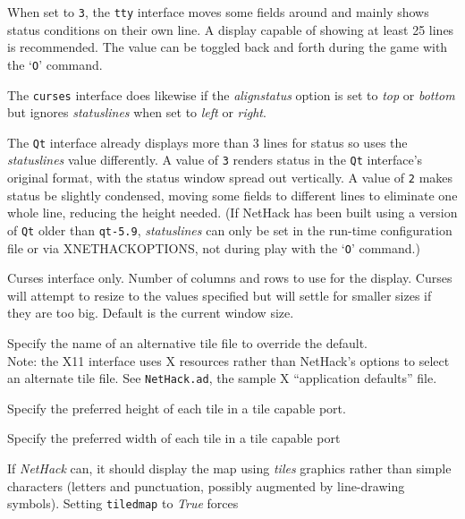 \documentclass[titlepage]{article}
\begin{document}
\begin{description}[font=\mdseries\itshape]
When set to \texttt{3}, the \texttt{tty} interface moves some fields around and
mainly shows status conditions on their own line.
A display capable of showing at least 25 lines is recommended.
The value can be toggled back and forth during the game with the `\texttt{O}'
command.

The \texttt{curses} interface does likewise if the
\textit{align\textunderscore status}
option is set to \textit{top} or \textit{bottom} but ignores
\textit{statuslines}
when set to \textit{left} or \textit{right}.

The \texttt{Qt} interface already displays more than 3 lines for status
so uses the
\textit{statuslines}
value differently.
A value of \texttt{3} renders status in the \texttt{Qt} interface's
original format, with the status window spread out vertically.
A value of \texttt{2} makes status be slightly condensed, moving some
fields to different lines to eliminate one whole line, reducing the
height needed.
(If NetHack has been built using a version of \texttt{Qt}
older than \texttt{qt-5.9},
\textit{statuslines}
can only be set in the run-time configuration file or via XNETHACKOPTIONS,
not during play with the `\texttt{O}' command.)
\item[term\textunderscore cols \textrm{and}]
\item[term\textunderscore rows]
Curses interface only.
Number of columns and rows to use for the display.
Curses will attempt to resize to the values specified but will settle
for smaller sizes if they are too big.
Default is the current window size.
\item[tile\textunderscore file]
Specify the name of an alternative tile file to override the default.
\\
Note: the X11 interface uses X resources rather than NetHack's options
to select an alternate tile file.
See \texttt{NetHack.ad}, the sample X ``application defaults'' file.
\item[tile\textunderscore height]
Specify the preferred height of each tile in a tile capable port.
\item[tile\textunderscore width]
Specify the preferred width of each tile in a tile capable port
\item[tiled\textunderscore map]
If \textit{NetHack} can, it should display the map using \textit{tiles} graphics
rather than simple characters (letters and punctuation, possibly
augmented by line-drawing symbols).
Setting \texttt{tiled\textunderscore map} to \textit{True} forces

\end{description}
\end{document}
